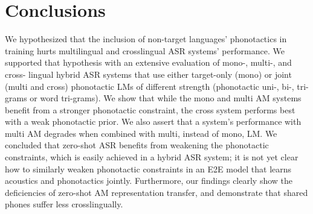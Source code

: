 \documentclass{article}
\begin{document}
\section{Conclusions}

We hypothesized that the inclusion of non-target languages' phonotactics in training hurts multilingual and crosslingual ASR systems' performance. We supported that hypothesis with an extensive evaluation of mono-, multi-, and cross- lingual hybrid ASR systems that use either target-only (mono) or joint (multi and cross) phonotactic LMs of different strength (phonotactic uni-, bi-, tri- grams or word tri-grams). We show that while the mono and multi AM systems benefit from a stronger phonotactic constraint, the cross system performs best with a weak phonotactic prior. We also assert that a system's performance with multi AM degrades when combined with multi, instead of mono, LM. We concluded that zero-shot ASR benefits from weakening the phonotactic constraints, which is easily achieved in a hybrid ASR system; it is not yet clear how to similarly weaken phonotactic constraints in an E2E model that learns acoustics and phonotactics jointly. Furthermore, our findings clearly show the deficiencies of zero-shot AM representation transfer, and demonstrate that shared phones suffer less crosslingually. 




\begin{small}

\end{small}
\end{document}
